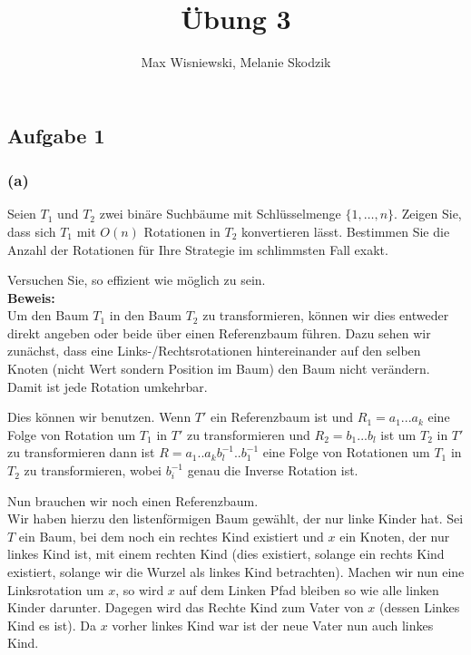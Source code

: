 \documentclass[11pt,a4paper,ngerman]{article}
\date{}
\title{Übung 3}
\author{Max Wisniewski, Melanie Skodzik}
\begin{document}

\renewcommand{\figurename}{Grafik}

\maketitle
\thispagestyle{fancy}


\subsection*{Aufgabe 1}

\subsubsection*{(a)}
Seien $T_1$ und $T_2$ zwei binäre Suchbäume mit Schlüsselmenge $\{1, \ldots, n\}$. Zeigen Sie, dass sich $T_1$ mit $O(n)$ Rotationen in $T_2$ konvertieren lässt. Bestimmen Sie die Anzahl der Rotationen für Ihre Strategie im schlimmsten Fall exakt.

Versuchen Sie, so effizient wie möglich zu sein.\\

\noindent\textbf{Beweis:}\\

Um den Baum $T_1$ in den Baum $T_2$ zu transformieren, können wir dies entweder direkt angeben oder beide über einen Referenzbaum führen. Dazu sehen wir zunächst, dass eine Links-/Rechtsrotationen hintereinander auf den selben Knoten (nicht Wert sondern Position im Baum) den Baum nicht verändern. Damit ist jede Rotation umkehrbar.

Dies können wir benutzen. Wenn $T'$ ein Referenzbaum ist und $R_1 = a_1 ... a_k$ eine Folge von Rotation um $T_1$ in $T'$ zu transformieren und
$R_2 = b_1 ... b_l$ ist um $T_2$ in $T'$ zu transformieren dann ist $R = a_1 .. a_k b_l^{-1} .. b_1^{-1}$ eine Folge von Rotationen um $T_1$ in $T_2$ zu transformieren,
wobei $b_i^{-1}$ genau die Inverse Rotation ist.

Nun brauchen wir noch einen Referenzbaum.\\

Wir haben hierzu den listenförmigen Baum gewählt, der nur linke Kinder hat. Sei $T$ ein Baum, bei dem noch ein rechtes Kind existiert und $x$ ein Knoten, der nur linkes Kind ist, mit einem rechten Kind (dies existiert, solange ein rechts Kind existiert, solange wir die Wurzel als linkes Kind betrachten). Machen wir nun eine Linksrotation um $x$,
so wird $x$ auf dem Linken Pfad bleiben so wie alle linken Kinder darunter. Dagegen wird das Rechte Kind zum Vater von $x$ (dessen Linkes Kind es ist). Da $x$ vorher linkes Kind war ist der neue Vater nun auch linkes Kind.\\
\end{document}
